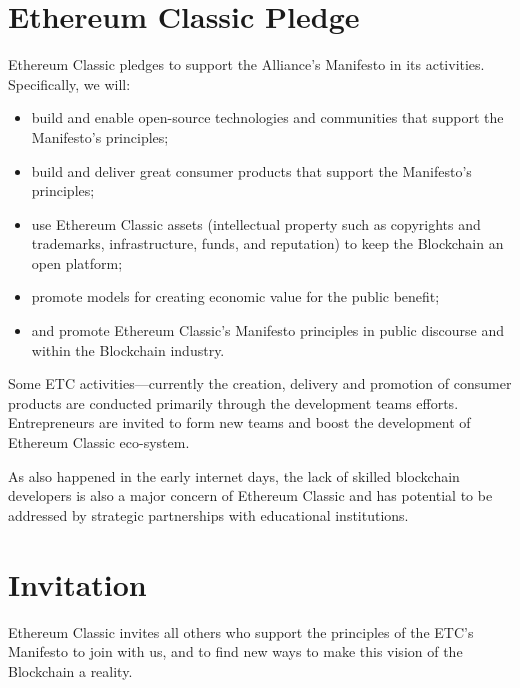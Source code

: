 \documentclass[twoside,twocolumn]{article}
\begin{document}
\section{Ethereum Classic Pledge}
Ethereum Classic pledges to support the Alliance's Manifesto in
its activities. Specifically, we will:

\begin{itemize}
  \item build and enable open-source technologies and communities that support
  the Manifesto’s principles;
  \item build and deliver great consumer products that support the Manifesto’s
  principles;
  \item use Ethereum Classic assets (intellectual property such as copyrights and
  trademarks, infrastructure, funds, and reputation) to keep the Blockchain an
  open platform;
  \item promote models for creating economic value for the public benefit;
  \item and promote Ethereum Classic's Manifesto principles in public discourse and
  within the Blockchain industry.
\end{itemize}

Some ETC activities—currently the creation, delivery and promotion of
consumer products are conducted primarily through the development teams efforts. Entrepreneurs are invited to form
new teams and boost the development of Ethereum Classic eco-system.

As also happened in the early internet days, the lack of skilled
blockchain developers is also a major concern of Ethereum Classic and has potential to be addressed by strategic partnerships with educational institutions.

\section{Invitation}

Ethereum Classic invites all others who support the principles of the
ETC's Manifesto to join with us, and to find new ways to make this vision
of the Blockchain a reality.


\end{document}
